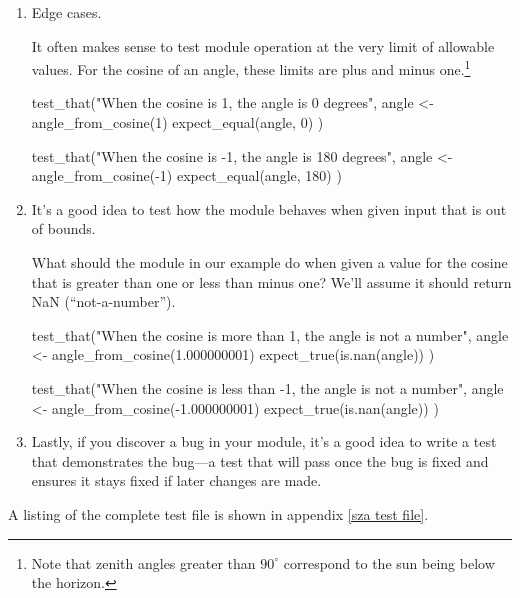 \documentclass{article}\usepackage[]{graphicx}\usepackage[]{color}
\begin{document}
\begin{enumerate}
\begin{enumerate}

    Then our test becomes simply

    \begin{Rexample}[6]
      test_that("When the cosine is 1/2, the angle is 60 degrees.", {
        angle <- angle_from_cosine(0.5)
        expect_equal(angle, 60)
      })
    \end{Rexample}


  \item Edge cases.

    It often makes sense to test module operation at the very
    limit of allowable values.  For the cosine of an angle, these
    limits are plus and minus one.\footnote{Note that zenith
      angles greater than $90^\circ$ correspond to the sun being
      below the horizon.}

    \begin{Rexample}[6]
      test_that("When the cosine is 1, the angle is 0 degrees", {
        angle <- angle_from_cosine(1)
        expect_equal(angle, 0)
      })

      test_that("When the cosine is -1, the angle is 180 degrees", {
        angle <- angle_from_cosine(-1)
        expect_equal(angle, 180)
      })
    \end{Rexample}

  \item It's a good idea to test how the module behaves when given
    input that is out of bounds.

    What should the module in our example do when given a value for
    the cosine that is greater than one or less than minus one?
    We'll assume it should return NaN (``not-a-number'').

    \begin{Rexample}[6]
      test_that("When the cosine is more than 1, the angle is not a number", {
        angle <- angle_from_cosine(1.000000001)
        expect_true(is.nan(angle))
      })

      test_that("When the cosine is less than -1, the angle is not a number", {
        angle <- angle_from_cosine(-1.000000001)
        expect_true(is.nan(angle))
      })
    \end{Rexample}

  \item Lastly, if you discover a bug in your module, it's a good
    idea to write a test that demonstrates the bug---a test that
    will pass once the bug is fixed and ensures it stays fixed if
    later changes are made.

  \end{enumerate}

  A listing of the complete test file is shown in appendix \ref{sza
    test file}.

\end{enumerate}
\end{document}
